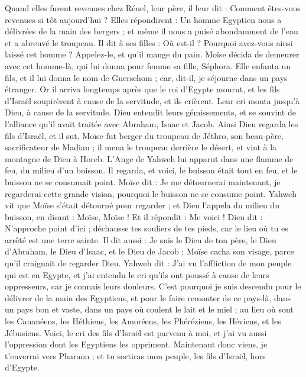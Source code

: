 \begin{multicols}{2}
Quand elles furent revenues chez Réuel, leur père, il leur dit : Comment êtes-vous revenues si tôt aujourd'hui ?
Elles répondirent : Un homme Egyptien nous a délivrées de la main des bergers ; et même il nous a puisé abondamment de l'eau et a abreuvé le troupeau.
Il dit à ses filles : Où est-il ? Pourquoi avez-vous ainsi laissé cet homme ? Appelez-le, et qu'il mange du pain.
Moïse décida de demeurer avec cet homme-là, qui lui donna pour femme sa fille, Séphora.
Elle enfanta un fils, et il lui donna le nom de Guerschom ; car, dit-il, je séjourne dans un pays étranger.
Or il arriva longtemps après que le roi d'Egypte mourut, et les fils d'Israël soupirèrent à cause de la servitude, et ils crièrent. Leur cri monta jusqu'à Dieu, à cause de la servitude\FTNT{}.
Dieu entendit leurs gémissements, et se souvint de l'alliance qu'il avait traitée avec Abraham, Isaac et Jacob.
Ainsi Dieu regarda les fils d'Israël, et il sut.
\VerseOne{}Moïse fut berger du troupeau de Jéthro, son beau-père, sacrificateur de Madian ; il mena le troupeau derrière le désert, et vint à la montagne de Dieu à Horeb.
L'Ange de Yahweh\FTNT{} lui apparut dans une flamme de feu, du milieu d'un buisson. Il regarda, et voici, le buisson était tout en feu, et le buisson ne se consumait point.
Moïse dit : Je me détournerai maintenant, je regarderai cette grande vision, pourquoi le buisson ne se consume point.
Yahweh vit que Moïse s'était détourné pour regarder ; et Dieu l'appela du milieu du buisson, en disant : Moïse, Moïse ! Et il répondit : Me voici !
Dieu dit : N'approche point d'ici ; déchausse tes souliers de tes pieds, car le lieu où tu es arrêté est une terre sainte.
Il dit aussi : Je suis le Dieu de ton père, le Dieu d'Abraham, le Dieu d'Isaac, et le Dieu de Jacob\FTNT{} ; Moïse cacha son visage, parce qu'il craignait de regarder Dieu.
Yahweh dit : J'ai vu l'affliction de mon peuple qui est en Egypte, et j'ai entendu le cri qu'ils ont poussé à cause de leurs oppresseurs, car je connais leurs douleurs.
C'est pourquoi je suis descendu pour le délivrer de la main des Egyptiens, et pour le faire remonter de ce pays-là, dans un pays bon et vaste, dans un pays où coulent le lait et le miel ; au lieu où sont les Cananéens, les Héthiens, les Amoréens, les Phéréziens, les Héviens, et les Jébusiens.
Voici, le cri des fils d'Israël est parvenu à moi, et j'ai vu aussi l'oppression dont les Egyptiens les oppriment.
Maintenant donc viens, je t'enverrai vers Pharaon ; et tu sortiras mon peuple, les fils d'Israël, hors d'Egypte\FTNT{}.

\end{multicols}
